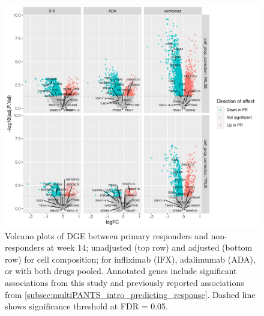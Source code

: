 \begin{figure}
    \centering
    \includegraphics[width=1.0\textwidth,page=1]{mainmatter/figures/chapter_04/plot_gene_set_enrichment.dge_result_volcano_simple_C_3RI_3NI,C_3RA_3NA,C_3R_3N.pdf}
    \caption{Volcano plots of \gls{DGE} between primary responders and non-responders at week 14; unadjusted (top row) and adjusted (bottom row) for cell composition; for infliximab (IFX), adalimumab (ADA), or with both drugs pooled. Annotated genes include significant associations from this study and previously reported associations from \autoref{subsec:multiPANTS_intro_predicting_response}. Dashed line shows significance threshold at FDR = 0.05.}
    \label{fig:multipants_dge_volcano_week_14_R_N}
\end{figure}

